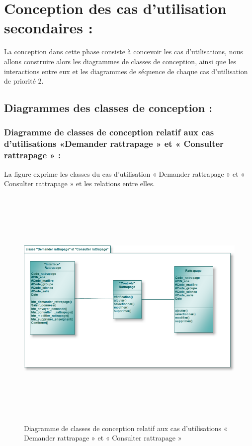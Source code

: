 \documentclass[12 pt ]{report}
\begin{document}
\section{Conception des cas d’utilisation secondaires :}
La conception dans cette phase consiste à concevoir les cas d’utilisations, nous allons construire alors les diagrammes de classes de conception, ainsi que les interactions entre eux et les diagrammes de séquence de chaque cas d’utilisation de priorité 2.
\newpage
\subsection{Diagrammes des classes de conception :}

\subsubsection{Diagramme de classes de conception relatif aux cas d'utilisations      «Demander rattrapage » et « Consulter rattrapage »  :}
La figure  exprime les classes du cas d’utilisation « Demander rattrapage » et « Consulter rattrapage » et les relations entre elles.
\begin{figure}[h]
 \begin{center}
\includegraphics[width= 16 cm ,height=  12cm]{cl_dr.PNG}
\caption{Diagramme de classes de conception relatif aux cas d'utilisations « Demander rattrapage » et « Consulter rattrapage » }

\end{center}
\end{figure}
\newpage
\end{document}
